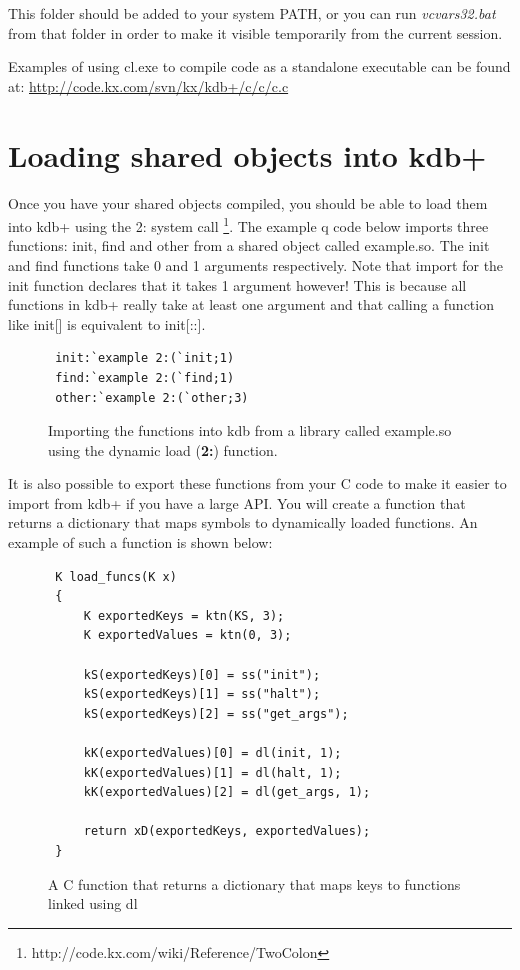  This folder should be added to your system PATH, or you can run \textit{vcvars32.bat} from that folder in order to make it visible temporarily from the current session.
 
 Examples of using cl.exe to compile code as a standalone executable can be found at: 
 \url{http://code.kx.com/svn/kx/kdb+/c/c/c.c}
 
 \section{Loading shared objects into kdb+}
 
 Once you have your shared objects compiled, you should be able to load them into kdb+ using the 2: system call \footnote{http://code.kx.com/wiki/Reference/TwoColon}. The example q code below imports three functions: init, find and other from a shared object called example.so. The init and find functions take 0 and 1 arguments respectively. Note that import for the init function declares that it takes 1 argument however! This is because all functions in kdb+ really take at least one argument and that calling a function like init[] is equivalent to init[::].
 
 \begin{figure}[h]
 \begin{lstlisting}
 init:`example 2:(`init;1)
 find:`example 2:(`find;1)
 other:`example 2:(`other;3)
 \end{lstlisting}
 \caption{Importing the functions into kdb from a library called example.so using the dynamic load (\textbf{2:}) function.}
 \end{figure}
 
 It is also possible to export these functions from your C code to make it easier to import from kdb+ if you have a large API. You will create a function that returns a dictionary that maps symbols to dynamically loaded functions. An example of such a function is shown below:
 
 \begin{figure}[h]
 \begin{lstlisting}
 K load_funcs(K x)
 {
	 K exportedKeys = ktn(KS, 3);
	 K exportedValues = ktn(0, 3);
 
	 kS(exportedKeys)[0] = ss("init");
	 kS(exportedKeys)[1] = ss("halt");
	 kS(exportedKeys)[2] = ss("get_args");
 
	 kK(exportedValues)[0] = dl(init, 1);
	 kK(exportedValues)[1] = dl(halt, 1);
	 kK(exportedValues)[2] = dl(get_args, 1);
 
	 return xD(exportedKeys, exportedValues);
 }
 \end{lstlisting}
 \caption{A C function that returns a dictionary that maps keys to functions linked using dl}
 \end{figure}
 

